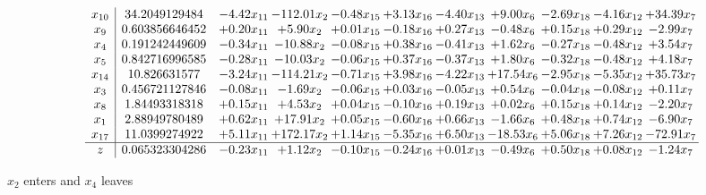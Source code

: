 \documentclass[9pt]{article}
\begin{document}
 \[\begin{array}{c| c c@{\hskip 2pt} c@{\hskip 2pt} c@{\hskip 2pt} c@{\hskip 2pt} c@{\hskip 2pt} c@{\hskip 2pt} c@{\hskip 2pt} c@{\hskip 2pt} c@{\hskip 2pt} }
 x_{10}   &  34.2049129484 & -4.42 x_{11} & -112.01 x_{2} & -0.48 x_{15} & +  3.13 x_{16} & -4.40 x_{13} & +  9.00 x_{6} & -2.69 x_{18} & -4.16 x_{12} & + 34.39 x_{7}\\
 x_{9}   &  0.603856646452 & +  0.20 x_{11} & +  5.90 x_{2} & +  0.01 x_{15} & -0.18 x_{16} & +  0.27 x_{13} & -0.48 x_{6} & +  0.15 x_{18} & +  0.29 x_{12} & -2.99 x_{7}\\
 x_{4}   &  0.191242449609 & -0.34 x_{11} & -10.88 x_{2} & -0.08 x_{15} & +  0.38 x_{16} & -0.41 x_{13} & +  1.62 x_{6} & -0.27 x_{18} & -0.48 x_{12} & +  3.54 x_{7}\\
 x_{5}   &  0.842716996585 & -0.28 x_{11} & -10.03 x_{2} & -0.06 x_{15} & +  0.37 x_{16} & -0.37 x_{13} & +  1.80 x_{6} & -0.32 x_{18} & -0.48 x_{12} & +  4.18 x_{7}\\
 x_{14}   &  10.826631577 & -3.24 x_{11} & -114.21 x_{2} & -0.71 x_{15} & +  3.98 x_{16} & -4.22 x_{13} & + 17.54 x_{6} & -2.95 x_{18} & -5.35 x_{12} & + 35.73 x_{7}\\
 x_{3}   &  0.456721127846 & -0.08 x_{11} & -1.69 x_{2} & -0.06 x_{15} & +  0.03 x_{16} & -0.05 x_{13} & +  0.54 x_{6} & -0.04 x_{18} & -0.08 x_{12} & +  0.11 x_{7}\\
 x_{8}   &  1.84493318318 & +  0.15 x_{11} & +  4.53 x_{2} & +  0.04 x_{15} & -0.10 x_{16} & +  0.19 x_{13} & +  0.02 x_{6} & +  0.15 x_{18} & +  0.14 x_{12} & -2.20 x_{7}\\
 x_{1}   &  2.88949780489 & +  0.62 x_{11} & + 17.91 x_{2} & +  0.05 x_{15} & -0.60 x_{16} & +  0.66 x_{13} & -1.66 x_{6} & +  0.48 x_{18} & +  0.74 x_{12} & -6.90 x_{7}\\
 x_{17}   &  11.0399274922 & +  5.11 x_{11} & + 172.17 x_{2} & +  1.14 x_{15} & -5.35 x_{16} & +  6.50 x_{13} & -18.53 x_{6} & +  5.06 x_{18} & +  7.26 x_{12} & -72.91 x_{7}\\
\hline
z    &  0.065323304286 & -0.23 x_{11} & +  1.12 x_{2} & -0.10 x_{15} & -0.24 x_{16} & +  0.01 x_{13} & -0.49 x_{6} & +  0.50 x_{18} & +  0.08 x_{12} & -1.24 x_{7}\\
\end{array}\]


 $ x_{2} $ enters and $ x_{4} $ leaves 
\end{document}
